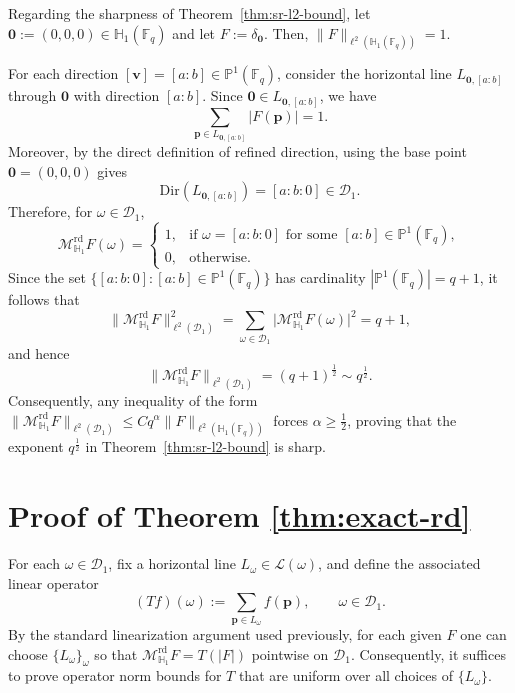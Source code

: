 \documentclass[11pt]{article}
\newcommand{\cL}{\mathcal{L}}
\newcommand{\1}{\mathbf 1}
\newcommand{\bfp}{\mathbf{p}}
\begin{document}
Regarding the sharpness of Theorem~\ref{thm:sr-l2-bound}, let $\mathbf 0:=(0,0,0)\in \mathbb H_1(\mathbb F_q)$ and let $F:=\delta_{\mathbf 0}$. Then, $\|F\|_{\ell^2(\mathbb H_1(\mathbb F_q))}=1$.

For each direction $[\mathbf{v}]=[a:b]\in \mathbb P^1(\mathbb F_q)$, consider the horizontal line
$L_{\mathbf 0,[a:b]}$ through $\mathbf 0$ with direction $[a:b]$.
Since $\mathbf 0\in L_{\mathbf 0,[a:b]}$, we have
\[
\sum_{\bfp\in L_{\mathbf 0,[a:b]}} |F(\bfp)| = 1.
\]
{ 
Moreover, by the direct definition of refined direction, using the base point \(\mathbf 0=(0,0,0)\) gives
\[
\mathrm{Dir}\!\left(L_{\mathbf 0,[a:b]}\right) = [a:b:0]\in \mathcal D_1.
\]
}
Therefore, for $\omega\in\mathcal D_1$,
\[
\mathcal{M}^{\mathrm{rd}}_{\mathbb H_1}F(\omega)
=
\begin{cases}
1, & \text{if }\omega=[a:b:0]\text{ for some }[a:b]\in\mathbb P^1(\mathbb F_q),\\
0, & \text{otherwise}.
\end{cases}
\]
Since the set $\{[a:b:0] : [a:b]\in\mathbb P^1(\mathbb F_q)\}$ has cardinality
$|\mathbb P^1(\mathbb F_q)|=q+1$, it follows that
\[
\|\mathcal{M}^{\mathrm{rd}}_{\mathbb H_1}F\|_{\ell^2(\mathcal D_1)}^2
=
\sum_{\omega\in\mathcal D_1}\bigl|\mathcal{M}^{\mathrm{rd}}_{\mathbb H_1}F(\omega)\bigr|^2
=
q+1,
\]
and hence
\[
\|\mathcal{M}^{\mathrm{rd}}_{\mathbb H_1}F\|_{\ell^2(\mathcal D_1)}
=
(q+1)^{\frac{1}{2}}
\sim q^{\frac{1}{2}}.
\]
Consequently, any inequality of the form
$\|\mathcal{M}^{\mathrm{rd}}_{\mathbb H_1}F\|_{\ell^2(\mathcal D_1)}
\le C q^{\alpha}\|F\|_{\ell^2(\mathbb H_1(\mathbb F_q))}$
forces $\alpha\ge \tfrac12$, proving that the exponent $q^{\frac{1}{2}}$ in
Theorem~\ref{thm:sr-l2-bound} is sharp.



\section{Proof of Theorem \ref{thm:exact-rd}}\label{section9}



For each $\omega\in\mathcal D_1$, fix a horizontal line $L_\omega\in \cL(\omega)$,
and define the associated linear operator
\[
(Tf)(\omega):=\sum_{\mathbf p\in L_\omega} f(\mathbf p),
\qquad \omega\in\mathcal D_1.
\]
By the standard linearization argument used previously, for each given $F$ one can choose $\{L_\omega\}_\omega$ so that
$\mathcal{M}^{\mathrm{rd}}_{\mathbb H_1}F = T(|F|)$ pointwise on $\mathcal D_1$.
Consequently, it suffices to prove operator norm bounds for $T$ that are uniform over all choices of $\{L_\omega\}$.
\end{document}
